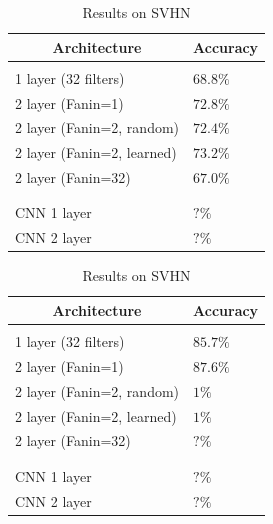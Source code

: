 \documentclass{article} %
\begin{document}
\begin {table}
\parbox{.5\linewidth}{
\caption{Results on CIFAR-10}
\label{resuts-cifar10}
\begin{center}
\begin{tabular}{ll}
\multicolumn{1}{c}{\bf Architecture}  &\multicolumn{1}{c}{\bf Accuracy}
\\ \hline \\
1 layer (32 filters)                            & $68.8\%$\\
2 layer (Fanin=1)                            &$72.8\%$ \\
2 layer (Fanin=2, random)            &$72.4\%$ \\
2 layer (Fanin=2, learned)            &$73.2\%$\\
2 layer (Fanin=32)                          &$67.0\%$\\
\\ \hline \\
CNN 1 layer                                    &$?\%$\\
CNN 2 layer                                    &$?\%$\\
\end{tabular}
\end{center}
}
\parbox{.5\linewidth}{
\caption{Results on SVHN}
\label{resuts-svhn}
\begin{center}
\begin{tabular}{ll}
\multicolumn{1}{c}{\bf Architecture}  &\multicolumn{1}{c}{\bf Accuracy}
\\ \hline \\
1 layer (32 filters)                          & $85.7\%$\\
2 layer (Fanin=1)                           &$87.6\%$ \\
2 layer (Fanin=2, random)           &$1\%$ \\
2 layer (Fanin=2, learned)           &$1\%$\\
2 layer (Fanin=32)                        &$?\%$\\
\\ \hline \\
CNN 1 layer                                   &$?\%$\\
CNN 2 layer                                   &$?\%$\\
\end{tabular}
\end{center}
}
\end{table}
\end{document}
